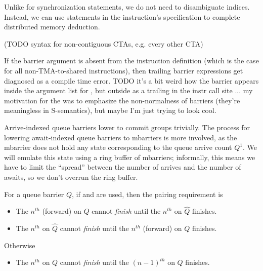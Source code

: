 \filbreak
{}

Unlike for synchronization statements, we do not need to disambiguate \lighttt{:} indices.
Instead, we can use  statements in the instruction's  specification to complete distributed memory deduction.



(TODO syntax for non-contiguous CTAs, e.g. every other CTA)

\filbreak
If the barrier argument is absent from the instruction definition (which is the case for all non-TMA-to-shared instructions), then trailing barrier expressions get diagnosed as a compile time error.
TODO it's a bit weird how the barrier appears inside the argument list for , but outside as a trailing  in the instr call site ... my motivation for the \lighttt{>>} was to emphasize the non-normalness of barriers (they're meaningless in S-semantics), but maybe I'm just trying to look cool.

\newpage
{}
\label{ch:mbarrier}

Arrive-indexed queue barriers lower to commit groups trivially.
The process for lowering await-indexed queue barriers to mbarriers is more involved, as the mbarrier does not hold any state corresponding to the queue arrive count $Q^1$.
We will emulate this state using a ring buffer of mbarriers; informally, this means we have to limit the ``spread'' between the number of arrives and the number of awaits, so we don't overrun the ring buffer.

For a  queue barrier $Q$, if  and  are used, then the pairing requirement is
\begin{itemize}
  \item The $n^{th}$ (forward)  on $Q$ cannot \textit{finish} until the $n^{th}$  on $\widehat{Q}$ finishes.
  \filbreak
  \item The $n^{th}$  on $\widehat{Q}$ cannot \textit{finish} until the $n^{th}$ (forward)  on $Q$ finishes.
\end{itemize}
\filbreak
Otherwise
\begin{itemize}
  \item The $n^{th}$  on $Q$ cannot \textit{finish} until the $(n-1)^{th}$  on $Q$ finishes.
\end{itemize}

